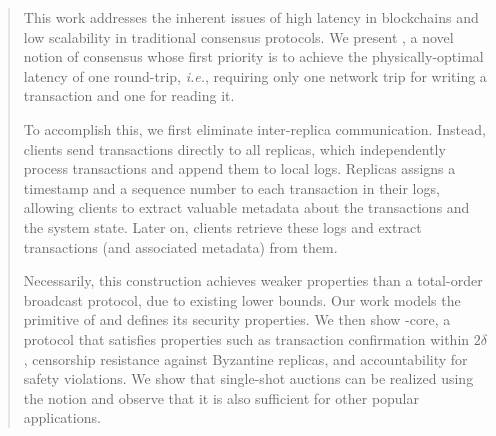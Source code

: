 \begin{abstract}
This work addresses the inherent issues of high latency in blockchains and low scalability in traditional consensus protocols.
We present \podtm, a novel notion of consensus whose first priority is to achieve the physically-optimal latency of one round-trip, \textit{i.e.}, requiring only one network trip for writing a transaction and one for reading it.

To accomplish this, we first eliminate inter-replica communication. Instead, clients send transactions directly to all replicas, which independently process transactions and append them to local logs.
Replicas assigns a timestamp and a sequence number to each transaction in their logs, allowing clients to extract valuable metadata about the transactions and the system state. Later on, clients retrieve these logs and extract transactions (and associated metadata) from them.

Necessarily, this construction achieves weaker properties than a total-order broadcast protocol, due to existing lower bounds.
Our work models the primitive of \podtm and defines its security properties.
We then show \podtm-core, a protocol that satisfies properties such as transaction confirmation within $2\delta$, censorship resistance against Byzantine replicas, and accountability for safety violations. We show that single-shot auctions can be realized using the \podtm notion and observe that it is also sufficient for other popular applications.




\end{abstract}
